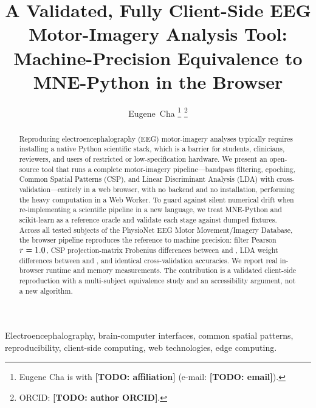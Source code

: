 \documentclass[journal]{IEEEtran}
\newcommand{\todo}[1]{\textbf{[TODO: #1]}}
\begin{document}
\title{A Validated, Fully Client-Side EEG Motor-Imagery Analysis Tool:\\
Machine-Precision Equivalence to MNE-Python in the Browser}

\author{Eugene~Cha%
\thanks{Eugene Cha is with \todo{affiliation} (e-mail: \todo{email}).}%
\thanks{ORCID: \todo{author ORCID}.}}


\maketitle

\begin{abstract}
Reproducing electroencephalography (EEG) motor-imagery analyses typically requires installing a
native Python scientific stack, which is a barrier for students, clinicians, reviewers, and users of
restricted or low-specification hardware. We present an open-source tool that runs a complete
motor-imagery pipeline---bandpass filtering, epoching, Common Spatial Patterns (CSP), and Linear
Discriminant Analysis (LDA) with cross-validation---entirely in a web browser, with no backend and
no installation, performing the heavy computation in a Web Worker. To guard against silent numerical
drift when re-implementing a scientific pipeline in a new language, we treat MNE-Python and
scikit-learn as a reference oracle and validate each stage against dumped fixtures. Across all
\Nsubjects{} tested subjects of the PhysioNet EEG Motor Movement/Imagery Database, the browser
pipeline reproduces the reference to machine precision: filter Pearson $r=1.0$, CSP
projection-matrix Frobenius differences between \CspFrobMin{} and \CspFrobMax{}, LDA weight
differences between \LdaDiffMin{} and \LdaDiffMax{}, and identical cross-validation accuracies. We
report real in-browser runtime and memory measurements. The contribution is a validated client-side
reproduction with a multi-subject equivalence study and an accessibility argument, not a new
algorithm.
\end{abstract}

\begin{IEEEkeywords}
Electroencephalography, brain-computer interfaces, common spatial patterns, reproducibility,
client-side computing, web technologies, edge computing.
\end{IEEEkeywords}
\end{document}
